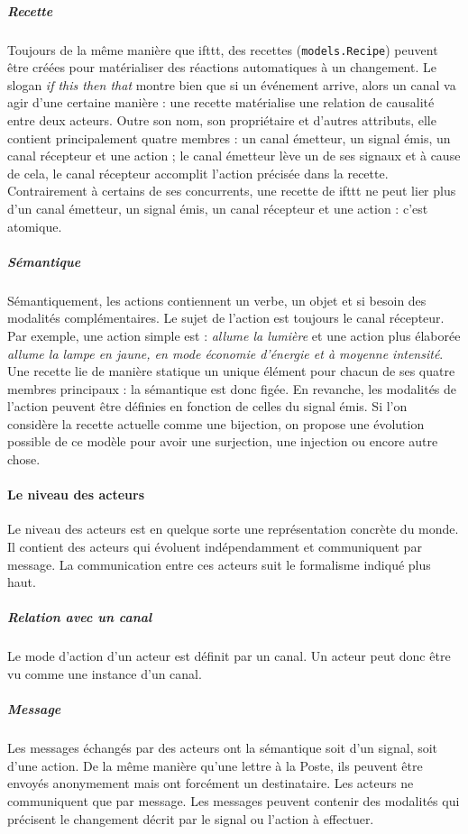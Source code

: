 \documentclass[11pt]{article}
\begin{document}
\subparagraph{Recette} Toujours de la même manière que ifttt, des recettes (\texttt{models.Recipe}) peuvent être créées pour matérialiser des réactions automatiques à un changement. Le slogan \textsl{if this then that} montre bien que si un événement arrive, alors un canal va agir d'une certaine manière : une recette matérialise une relation de causalité entre deux acteurs. Outre son nom, son propriétaire et d'autres attributs, elle contient principalement quatre membres : un canal émetteur, un signal émis, un canal récepteur et une action ; le canal émetteur lève un de ses signaux et à cause de cela, le canal récepteur accomplit l'action précisée dans la recette. Contrairement à certains de ses concurrents, une recette de ifttt ne peut lier plus d'un canal émetteur, un signal émis, un canal récepteur et une action : c'est atomique.

\subparagraph{Sémantique} Sémantiquement, les actions contiennent un verbe, un objet et si besoin des modalités complémentaires. Le sujet de l'action est toujours le canal récepteur. Par exemple, une action simple est : \textsl{allume la lumière} et une action plus élaborée \textsl{allume la lampe en jaune, en mode économie d'énergie et à moyenne intensité}. Une recette lie de manière statique un unique élément pour chacun de ses quatre membres principaux : la sémantique est donc figée. En revanche, les modalités de l'action peuvent être définies en fonction de celles du signal émis. Si l'on considère la recette actuelle comme une bijection, on propose une évolution possible de ce modèle pour avoir une surjection, une injection ou encore autre chose.

\paragraph{Le niveau des acteurs} Le niveau des acteurs est en quelque sorte une représentation concrète du monde. Il contient des acteurs qui évoluent indépendamment et communiquent par message. La communication entre ces acteurs suit le formalisme indiqué plus haut.

\subparagraph{Relation avec un canal} Le mode d'action d'un acteur est définit par un canal. Un acteur peut donc être vu comme une instance d'un canal.

\subparagraph{Message} Les messages échangés par des acteurs ont la sémantique soit d'un signal, soit d'une action. De la même manière qu'une lettre à la Poste, ils peuvent être envoyés anonymement mais ont forcément un destinataire. Les acteurs ne communiquent que par message. Les messages peuvent contenir des modalités qui précisent le changement décrit par le signal ou l'action à effectuer.
\end{document}
